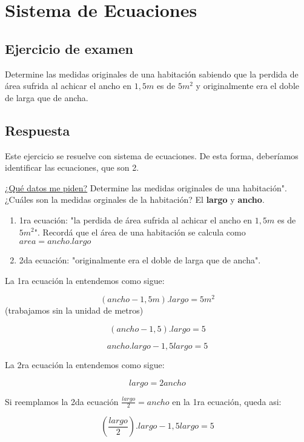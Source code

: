     \section{Sistema de Ecuaciones}
    
    \subsection{Ejercicio de examen}
    Determine las medidas originales de una habitación sabiendo que la perdida de área sufrida al achicar el ancho en $1,5m$ es de $5m^2$ y originalmente era el doble de larga que de ancha.
    
    \subsection{Respuesta}
    
    Este ejercicio se resuelve con sistema de ecuaciones. De esta forma, deberíamos identificar las ecuaciones, que son 2. 
    
    \underline{¿Qué datos me piden?}
    Determine las medidas originales de una habitación".
    ¿Cuáles son la medidas orginales de la habitación? El \textbf{largo} y \textbf{ancho}. 
    
    \begin{enumerate}
        \item 1ra ecuación: "la perdida de área sufrida al achicar el ancho en $1,5m$ es de $5m^2$". Recordá que el área de una habitación se calcula como $area=ancho.largo$
        \item 2da ecuación: "originalmente era el doble de larga que de ancha".
    \end{enumerate}
    
    

    La 1ra ecuación la entendemos como sigue:

    $$ (ancho-1,5m).largo = 5m^2 $$ (trabajamos sin la unidad de metros)
    
    $$ (ancho-1,5).largo = 5 $$
    
    $$ ancho.largo - 1,5largo = 5 $$
    
    La 2ra ecuación la entendemos como sigue:

    $$ largo = 2 ancho $$
    
    Si reemplamos la 2da ecuación $ \frac{largo}{2} = ancho $ en la 1ra ecuación, queda asi:
    
    $$ (\frac{largo}{2}).largo -1,5largo = 5 $$
    
